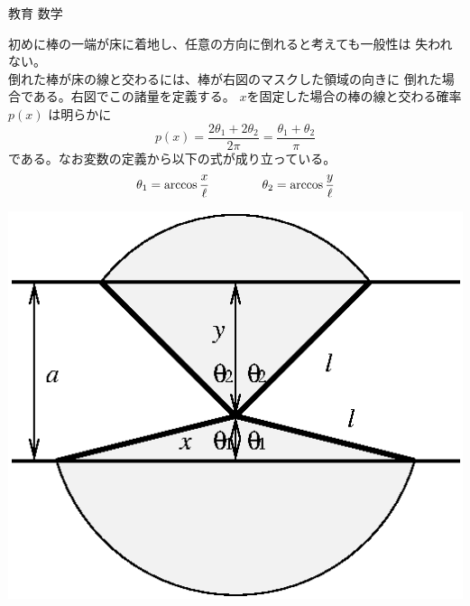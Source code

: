 \documentclass[fleqn]{jbook}
\begin{document}
\begin{answer}{教育 数学}{}
\begin{subanswers}
\SubAnswer
  \begin{subsubanswers}
  \SubSubAnswer
    \parbox[t]{85mm}{
    初めに棒の一端が床に着地し、任意の方向に倒れると考えても一般性は
    失われない。\\
%
    倒れた棒が床の線と交わるには、棒が右図のマスクした領域の向きに
    倒れた場合である。右図でこの諸量を定義する。
%
    $x$を固定した場合の棒の線と交わる確率 $p(x)$ は明らかに
%
    \[ p(x) = \frac{2\theta_1+2\theta_2}{2\pi} = %
              \frac{ \theta_1+ \theta_2}{\pi} \]
%
    である。なお変数の定義から以下の式が成り立っている。
%
    \[ \theta_1 = \arccos\frac{x}{\ell} \hspace{15mm} %
       \theta_2 = \arccos\frac{y}{\ell} \]
%
    }\parbox[t]{70mm}{\vspace*{-10mm}
    \begin{center}
      \mbox{\includegraphics[clip]{1995math-2.eps}}
    \end{center}}


\end{subsubanswers}
\end{subanswers}
\end{answer}
\end{document}
